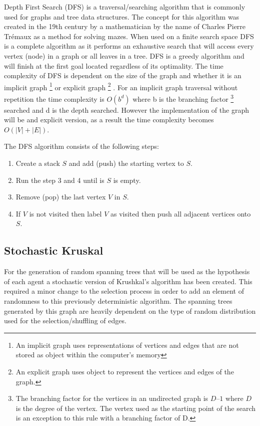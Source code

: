 \documentclass{AISB2008}
\begin{document}
{Depth First Search (DFS) is a traversal/searching algorithm that is commonly used for graphs and tree data structures. The concept for this algorithm was created in the 19th century by a mathematician by the name of Charles Pierre Trémaux as a method for solving mazes. When used on a finite search space DFS is a complete algorithm as it performs an exhaustive search that will access every vertex (node) in a graph or all leaves in a tree. DFS is a greedy algorithm and will finish at the first goal located regardless of its optimality. The time complexity of DFS is dependent on the size of the graph and whether it is an implicit graph \footnote{An implicit graph uses representations of vertices and edges that are not stored as object within the computer’s memory}  or explicit graph \footnote{An explicit graph uses object to represent the vertices and edges of the graph.} . For an implicit graph traversal without repetition the time complexity is {$O (b^d)$} where b is the branching factor \footnote{The branching factor for the vertices in an undirected graph is {$D – 1$} where {$D$} is the degree of the vertex. The vertex used as the starting point of the search is an exception to this rule with a branching factor of D.} searched and d is the depth searched. However the implementation of the graph will be and explicit version, as a result the time complexity becomes {$O (|V| + |E|)$}.

The DFS algorithm consists of the following steps:

\begin{enumerate}
\item Create a stack {$S$} and add (push) the starting vertex to {$S$}.
\item Run the step 3 and 4 until is {$S$} is empty.
\item Remove (pop) the last vertex {$V$} in {$S$}.
\item If {$V$} is not visited then label {$V$} as visited then push all adjacent vertices onto {$S$}.
\end{enumerate}


\subsection{Stochastic Kruskal}
\label{stochastic kruskal}

For the generation of random spanning trees that will be used as the hypothesis of each agent a stochastic version of Krushkal’s algorithm has been created. This required a minor change to the selection process in order to add an element of randomness to this previously deterministic algorithm. The spanning trees generated by this graph are heavily dependent on the type of random distribution used for the selection/shuffling of edges.

}
\end{document}
